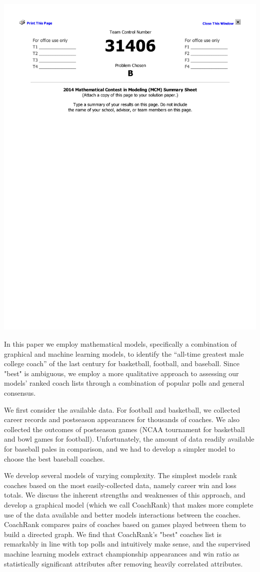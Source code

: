\documentclass[11pt,notitlepage]{article}
\begin{document}
\fancyhf{}
\includegraphics[trim= 100 525 100 100]{summary_sheet.pdf}

In this paper we employ mathematical models, specifically a combination of graphical and machine learning models, to identify the ``all-time greatest male college coach'' of the last century for basketball, football, and baseball. Since "best" is ambiguous, we employ a more qualitative approach to assessing our models' ranked coach lists through a combination of popular polls and general consensus.

We first consider the available data. For football and basketball, we collected career records and postseason appearances for thousands of coaches. We also collected the outcomes of postseason games (NCAA tournament for basketball and bowl games for football). Unfortunately, the amount of data readily available for baseball pales in comparison, and we had to develop a simpler model to choose the best baseball coaches.

We develop several models of varying complexity. The simplest models rank coaches based on the most easily-collected data, namely career win and loss totals. We discuss the inherent strengths and weaknesses of this approach, and develop a graphical model (which we call CoachRank) that makes more complete use of the data available and better models interactions between the coaches. CoachRank compares pairs of coaches based on games played between them to build a directed graph. We find that CoachRank's "best" coaches list is remarkably in line with top polls and intuitively make sense, and the supervised machine learning models extract championship appearances and win ratio as statistically significant attributes after removing heavily correlated attributes. 
\end{document}

